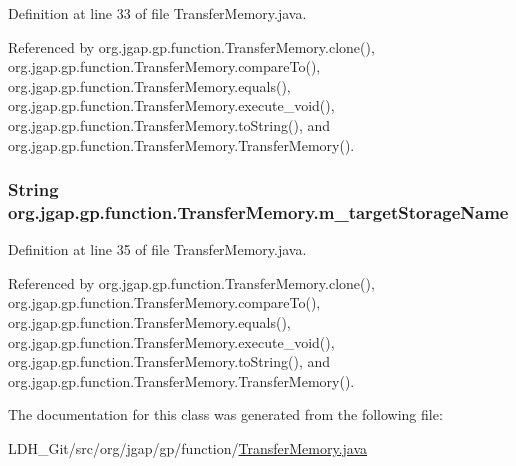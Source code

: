 Definition at line 33 of file Transfer\-Memory.\-java.



Referenced by org.\-jgap.\-gp.\-function.\-Transfer\-Memory.\-clone(), org.\-jgap.\-gp.\-function.\-Transfer\-Memory.\-compare\-To(), org.\-jgap.\-gp.\-function.\-Transfer\-Memory.\-equals(), org.\-jgap.\-gp.\-function.\-Transfer\-Memory.\-execute\-\_\-void(), org.\-jgap.\-gp.\-function.\-Transfer\-Memory.\-to\-String(), and org.\-jgap.\-gp.\-function.\-Transfer\-Memory.\-Transfer\-Memory().

\hypertarget{classorg_1_1jgap_1_1gp_1_1function_1_1_transfer_memory_aecf90e862244c4474eaf55194eba8802}{
\subsubsection[{m\-\_\-target\-Storage\-Name}]{\setlength{\rightskip}{0pt plus 5cm}String org.\-jgap.\-gp.\-function.\-Transfer\-Memory.\-m\-\_\-target\-Storage\-Name\hspace{0.3cm}{\ttfamily [private]}}}\label{classorg_1_1jgap_1_1gp_1_1function_1_1_transfer_memory_aecf90e862244c4474eaf55194eba8802}


Definition at line 35 of file Transfer\-Memory.\-java.



Referenced by org.\-jgap.\-gp.\-function.\-Transfer\-Memory.\-clone(), org.\-jgap.\-gp.\-function.\-Transfer\-Memory.\-compare\-To(), org.\-jgap.\-gp.\-function.\-Transfer\-Memory.\-equals(), org.\-jgap.\-gp.\-function.\-Transfer\-Memory.\-execute\-\_\-void(), org.\-jgap.\-gp.\-function.\-Transfer\-Memory.\-to\-String(), and org.\-jgap.\-gp.\-function.\-Transfer\-Memory.\-Transfer\-Memory().



The documentation for this class was generated from the following file\-:\begin{DoxyCompactItemize}
\item 
L\-D\-H\-\_\-\-Git/src/org/jgap/gp/function/\hyperlink{_transfer_memory_8java}{Transfer\-Memory.\-java}\end{DoxyCompactItemize}
